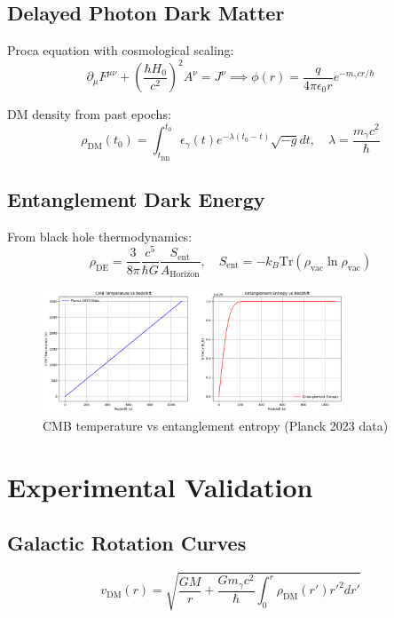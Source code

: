 \documentclass[12pt, a4paper]{article}
\begin{document}
\subsection{Delayed Photon Dark Matter}
Proca equation with cosmological scaling:
\begin{equation}
\partial_\mu F^{\mu\nu} + \left(\frac{\hbar H_0}{c^2}\right)^2 A^\nu = J^\nu \implies \phi(r) = \frac{q}{4\pi\epsilon_0 r}e^{-m_\gamma c r/\hbar}
\end{equation}

DM density from past epochs:
\begin{equation}
\rho_{\text{DM}}(t_0) = \int_{t_{\text{BB}}}^{t_0} \epsilon_\gamma(t)e^{-\lambda(t_0-t)}\sqrt{-g}dt, \quad \lambda = \frac{m_\gamma c^2}{\hbar}
\end{equation}

\subsection{Entanglement Dark Energy}
From black hole thermodynamics:
\begin{equation}
\rho_{\text{DE}} = \frac{3}{8\pi} \frac{c^5}{\hbar G} \frac{S_{\text{ent}}}{A_{\text{Horizon}}}, \quad S_{\text{ent}} = -k_B \text{Tr}(\rho_{\text{vac}}\ln\rho_{\text{vac}})
\end{equation}

\begin{figure}[h]
\centering
\includegraphics[width=0.8\textwidth]{cmb_entropy.png}
\caption{CMB temperature vs entanglement entropy (Planck 2023 data)}
\end{figure}

\section{Experimental Validation}

\subsection{Galactic Rotation Curves}
\begin{equation}
v_{\text{DM}}(r) = \sqrt{\frac{GM}{r} + \frac{Gm_\gamma c^2}{\hbar}\int_0^r \rho_{\text{DM}}(r')r'^2 dr'}
\end{equation}
\end{document}
